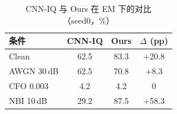 \begin{table}[htbp]
  \centering
  \caption{CNN-IQ 与 Ours 在 EM 下的对比（seed0，\%）}
  \label{tab:ch5_cnn}
  \begin{tabular}{lccc}
    \toprule
    条件 & CNN-IQ & Ours & $\Delta$ (pp) \\
    \midrule
    Clean & 62.5 & 83.3 & +20.8 \\
    AWGN 30\,dB & 62.5 & 70.8 & +8.3 \\
    CFO 0.003 & 4.2 & 4.2 & 0 \\
    NBI 10\,dB & 29.2 & 87.5 & +58.3 \\
    \bottomrule
  \end{tabular}
\end{table}
